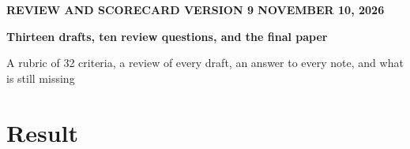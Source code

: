 \documentclass[10pt,letterpaper]{extarticle}
\newcommand{\NCrit}{32}
\begin{document}
{\sffamily\scriptsize\color{accent}\textbf{REVIEW AND SCORECARD \;\textperiodcentered\; VERSION 9 \;\textperiodcentered\; NOVEMBER 10, 2026}}\par\vspace{4pt}
{\sffamily\bfseries\fontsize{20}{23}\selectfont Thirteen drafts, ten review questions, and the final paper\par}\vspace{3pt}
{\sffamily\fontsize{11}{14}\selectfont\color{ink2} A rubric of \NCrit{} criteria, a review of every draft, an answer to every note, and what is still missing\par}
\vspace{6pt}

\section*{Result}
\end{document}
